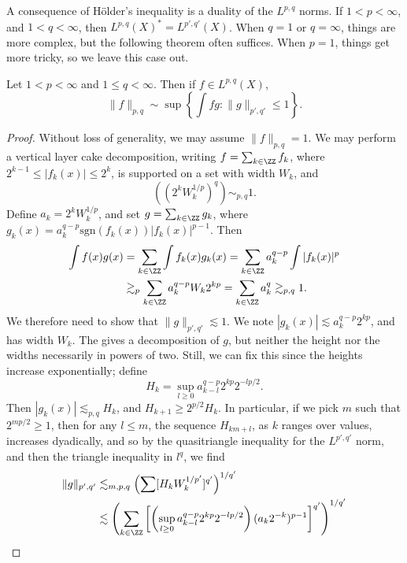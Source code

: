 A consequence of H\"{o}lder's inequality is a duality of the $L^{p,q}$ norms. If $1 < p < \infty$, and $1 < q < \infty$, then $L^{p,q}(X)^* = L^{p',q'}(X)$. When $q = 1$ or $q = \infty$, things are more complex, but the following theorem often suffices. When $p = 1$, things get more tricky, so we leave this case out.

\begin{theorem}
    Let $1 < p < \infty$ and $1 \leq q < \infty$. Then if $f \in L^{p,q}(X)$,
    \[ \| f \|_{p,q} \sim \sup \left\{ \int fg : \| g \|_{p',q'} \leq 1 \right\}. \]
\end{theorem}
\begin{proof}
    Without loss of generality, we may assume $\| f \|_{p,q} = 1$. We may perform a vertical layer cake decomposition, writing $f = \sum_{k \in \ZZ} f_k$, where $2^{k-1} \leq |f_k(x)| \leq 2^k$, is supported on a set with width $W_k$, and
    \[ \left( (2^k W_k^{1/p})^q \right) \sim_{p,q} 1. \]
    Define $a_k = 2^k W_k^{1/p}$, and set $g = \sum_{k \in \ZZ} g_k$, where $g_k(x) = a_k^{q-p} \text{sgn}(f_k(x)) |f_k(x)|^{p-1}$. Then
    \begin{align*}
        \int f(x) g(x) &= \sum_{k \in \ZZ} \int f_k(x) g_k(x) = \sum_{k \in \ZZ} a_k^{q-p} \int |f_k(x)|^p\\
        &\gtrsim_p \sum_{k \in \ZZ} a_k^{q-p} W_k 2^{kp} = \sum_{k \in \ZZ} a_k^q \gtrsim_{p,q} 1.
    \end{align*}
    We therefore need to show that $\| g \|_{p',q'} \lesssim 1$. We note $|g_k(x)| \lesssim a_k^{q-p} 2^{kp}$, and has width $W_k$. The gives a decomposition of $g$, but neither the height nor the widths necessarily in powers of two. Still, we can fix this since the heights increase exponentially; define
    \[ H_k = \sup_{l \geq 0} a_{k-l}^{q-p} 2^{kp} 2^{-lp/2}. \]
    Then $|g_k(x)| \lesssim_{p,q} H_k$, and $H_{k+1} \geq 2^{p/2} H_k$. In particular, if we pick $m$ such that $2^{mp/2} \geq 1$, then for any $l \leq m$, the sequence $H_{km + l}$, as $k$ ranges over values, increases dyadically, and so by the quasitriangle inequality for the $L^{p',q'}$ norm, and then the triangle inequality in $l^q$, we find
    \begin{align*}
        \| g \|_{p',q'} &\lesssim_{m,p,q} \left( \sum [H_k W_k^{1/p'}]^{q'} \right)^{1/q'}\\
        &\lesssim \left( \sum_{k \in \ZZ} \left[ \left( \sup_{l \geq 0} a_{k-l}^{q-p} 2^{kp} 2^{-lp/2} \right) (a_k 2^{-k})^{p-1} \right]^{q'} \right)^{1/q'}\\

\end{align*}
\end{proof}
